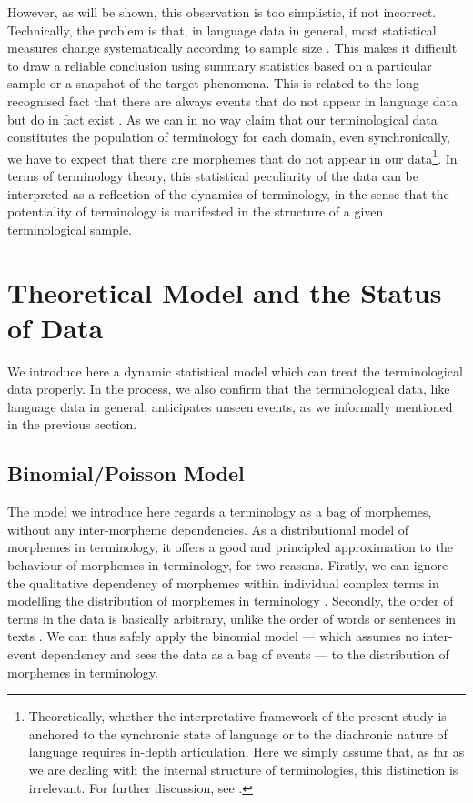 However, as will be shown, this observation is too simplistic, if not 
incorrect. Technically, the problem is that, in language data in general,
most statistical measures change systematically according to sample size
\cite{tweedie98}. This makes it difficult to draw a reliable conclusion using
summary statistics based on a particular sample or a snapshot of
the target phenomena. This is related to the long-recognised fact that there
are always events that do not appear in language data but do in fact exist
\cite{yule44,herdan60,mizu83}. As we can in no way claim that our
terminological data constitutes the population of terminology for each
domain, even synchronically, we have to expect that there are morphemes that
do not appear in our data\footnote{Theoretically, whether the interpretative
framework of the present study is anchored to the synchronic state of language
or to the diachronic nature of language requires in-depth articulation. Here
we simply assume that, as far as we are dealing with the internal structure
of terminologies, this distinction is irrelevant. For further discussion, see
\cite{kage00,kage02}.}. In terms of terminology theory, this statistical
peculiarity of the data can be interpreted as a reflection of the dynamics
of terminology, in the sense that the potentiality of terminology is manifested
in the structure of a given terminological sample.


\section{Theoretical Model and the Status of Data}


We introduce here a dynamic statistical model which can treat the
terminological data properly. In the process, we also confirm that the
terminological data, like language data in general, anticipates 
unseen events, as we informally mentioned in the previous section.


\subsection{Binomial/Poisson Model}
 
The model we introduce here regards a terminology as a bag of morphemes,
without any inter-morpheme dependencies. As a distributional model of
morphemes in terminology, it offers a good and principled approximation
to the behaviour of morphemes in terminology,
for two reasons. Firstly, we can ignore the qualitative dependency of
morphemes within individual complex terms in modelling the distribution
of morphemes in terminology \cite{kage98b}. Secondly, the order of terms
in the data is basically arbitrary, unlike the order of words or sentences
in texts \cite{baayen96a,baayen96b}. We can thus safely apply the binomial
model --- which assumes no inter-event dependency and sees the data as a bag
of events --- to the distribution of morphemes in terminology.

